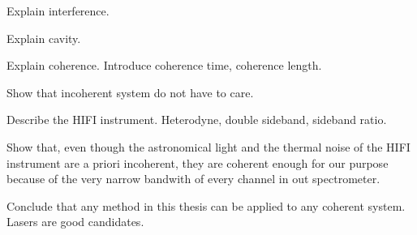 Explain interference.

Explain cavity.

Explain coherence.
Introduce coherence time, coherence length.

Show that incoherent system do not have to care.

Describe the HIFI instrument.
Heterodyne, double sideband, sideband ratio.

Show that, even though the astronomical light and the thermal noise of the HIFI instrument are a priori incoherent, they are coherent enough for our purpose because of the very narrow bandwith of every channel in out spectrometer.

Conclude that any method in this thesis can be applied to any coherent system.  Lasers are good candidates.
